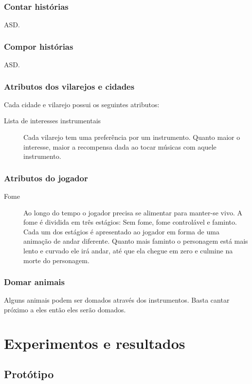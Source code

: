 \documentclass[12pt, 
openright, 
oneside, 
a4paper,    
brazil]{facom-ufu-abntex2}
\begin{document}
\subsection{Contar histórias}
ASD.
\subsection{Compor histórias}
ASD.
\subsection{Atributos dos vilarejos e cidades}
Cada cidade e vilarejo possui os seguintes atributos:
\begin{description}  
\item [Lista de interesses instrumentais] Cada vilarejo tem uma preferência por um instrumento. Quanto maior o interesse, maior a recompensa dada ao tocar músicas com aquele instrumento.
\end{description}

\subsection{Atributos do jogador}
\begin{description}  
\item [Fome] Ao longo do tempo o jogador precisa se alimentar para manter-se vivo. A fome é dividida em três estágios: Sem fome, fome controlável e faminto. Cada um dos estágios é
apresentado ao jogador em forma de uma animação de andar diferente. Quanto mais faminto o personagem está mais lento e curvado ele irá andar, até que ela chegue em zero e culmine na morte do personagem.
\end{description}

\subsection{Domar animais}
Alguns animais podem ser domados através dos instrumentos. Basta cantar próximo a eles então eles serão domados.


\chapter{Experimentos e resultados}
\label{sec:experim}

\section{Protótipo}
\end{document}
